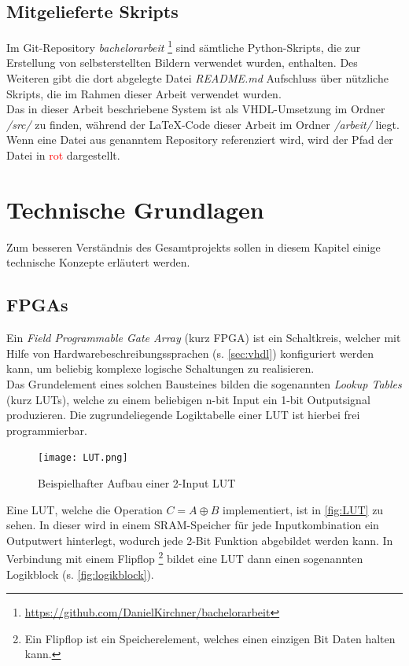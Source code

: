 \documentclass[a4paper,12pt,onesided]{report}
\begin{document}
\section{Mitgelieferte Skripts}
Im Git-Repository \textit{bachelorarbeit} \footnote{\url{https://github.com/DanielKirchner/bachelorarbeit}} sind sämtliche Python-Skripts, die zur Erstellung von selbsterstellten Bildern verwendet wurden, enthalten. Des Weiteren gibt die dort abgelegte Datei \textit{README.md} Aufschluss über nützliche Skripts, die im Rahmen dieser Arbeit verwendet wurden.\\
Das in dieser Arbeit beschriebene System ist als VHDL-Umsetzung im Ordner \textit{/src/} zu finden, während der \LaTeX-Code dieser Arbeit im Ordner \textit{/arbeit/} liegt.
Wenn eine Datei aus genanntem Repository referenziert wird, wird der Pfad der Datei in \textcolor{red}{rot} dargestellt.

\chapter{Technische Grundlagen}
Zum besseren Verständnis des Gesamtprojekts sollen in diesem Kapitel einige technische Konzepte erläutert werden.

\section{FPGAs}
\label{sec:fpga}
Ein \textit{Field Programmable Gate Array} (kurz FPGA) ist ein Schaltkreis, welcher mit Hilfe von Hardwarebeschreibungssprachen (s. \autoref{sec:vhdl})
konfiguriert werden kann, um beliebig komplexe logische Schaltungen zu realisieren.\\
Das Grundelement eines solchen Bausteines bilden die sogenannten \textit{Lookup Tables} (kurz LUTs), welche zu einem beliebigen n-bit Input ein 1-bit Outputsignal produzieren. Die zugrundeliegende Logiktabelle einer LUT ist hierbei frei programmierbar.

\begin{figure}[H]
	\centering
	\texttt{[image: LUT.png]}
	\caption{Beispielhafter Aufbau einer 2-Input LUT}
	\label{fig:LUT}
\end{figure}

Eine LUT, welche die Operation $C = A \oplus B$ implementiert, ist in \autoref{fig:LUT} zu sehen. In dieser wird in einem SRAM-Speicher für jede Inputkombination ein Outputwert hinterlegt, wodurch jede 2-Bit Funktion abgebildet werden kann. In Verbindung mit einem Flipflop \footnote{Ein Flipflop ist ein Speicherelement, welches einen einzigen Bit Daten halten kann.} bildet eine LUT dann einen sogenannten Logikblock (s. \autoref{fig:logikblock}).\cite{fpgaDesign}
\end{document}
